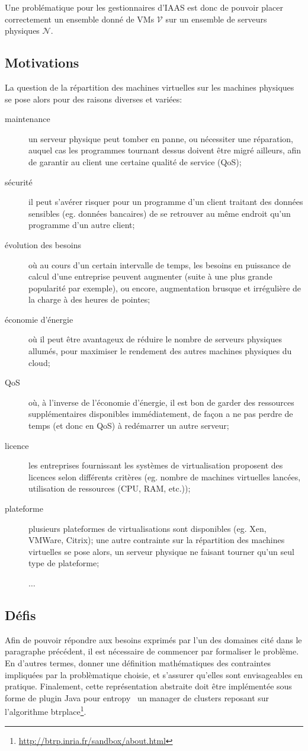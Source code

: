 \documentclass[a4paper]{article}
\begin{document}
Une problématique pour les gestionnaires d'IAAS est donc de pouvoir placer
correctement un ensemble donné de VMs $\mathcal{V}$ sur un ensemble de
serveurs physiques $\mathcal{N}$.

\subsection{Motivations}
La question de la répartition des machines virtuelles sur les machines
physiques se pose alors pour des raisons diverses et variées:
\begin{description}
	\item[maintenance] un serveur physique peut tomber en panne, ou
		nécessiter une réparation, auquel cas les programmes
		tournant dessus doivent être migré ailleurs, afin de
		garantir au client une certaine qualité de service (QoS);
	\item[sécurité] il peut s'avérer risquer pour un programme d'un
		client traitant des données sensibles (eg. données bancaires)
		de se retrouver au même endroit qu'un programme d'un
		autre client;
	\item[évolution des besoins] où au cours d'un certain intervalle de
		temps, les besoins en puissance de calcul d'une entreprise
		peuvent augmenter (suite à une plus grande popularité par
		exemple), ou encore, augmentation brusque et irrégulière
		de la charge à des heures de pointes;
	\item[économie d'énergie] où il peut être avantageux de réduire
		le nombre de serveurs physiques allumés, pour maximiser
		le rendement des autres machines physiques du cloud;
	\item[QoS] où, à l'inverse de l'économie d'énergie, il est bon
		de garder des ressources supplémentaires disponibles immédiatement,
		de façon a ne pas perdre de temps (et donc en QoS) à redémarrer
		un autre serveur;		
	\item[licence] les entreprises fournissant les systèmes de virtualisation
		proposent des licences selon différents critères (eg. nombre de
		machines virtuelles lancées, utilisation de ressources (CPU, RAM, etc.));
	\item[plateforme] plusieurs plateformes de virtualisations sont disponibles
		(eg. Xen, VMWare, Citrix); une autre contrainte sur la
		répartition des machines virtuelles se pose alors, un serveur
		physique ne faisant tourner qu'un seul type de plateforme;
	\item[] $\ldots$
\end{description}
\subsection{Défis}
Afin de pouvoir répondre aux besoins exprimés par l'un des domaines
cité dans le paragraphe précédent, il est nécessaire de commencer
par formaliser le problème. En d'autres termes, donner une définition
mathématiques des contraintes impliquées par la problèmatique choisie,
et s'assurer qu'elles sont envisageables en pratique. Finalement, cette
représentation abstraite doit être implémentée sous forme de plugin
Java pour entropy~\cite{herm2009} un manager de clusters reposant sur
l'algorithme btrplace\footnote{\url{http://btrp.inria.fr/sandbox/about.html}}.
\end{document}
